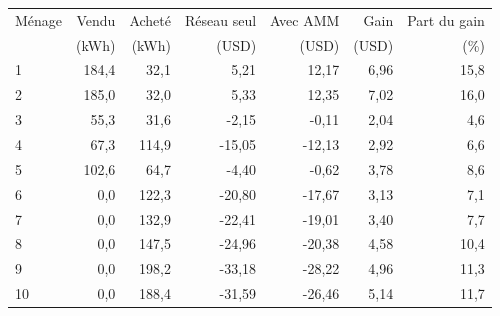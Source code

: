 \begin{tabular}{lrrrrrr}
\toprule
M\'enage & Vendu & Achet\'e & R\'eseau seul & Avec AMM & Gain & Part du gain \\
 & (kWh) & (kWh) & (USD) & (USD) & (USD) & (\%) \\
\midrule
1 & 184,4 & 32,1 & 5,21 & 12,17 & 6,96 & 15,8 \\
2 & 185,0 & 32,0 & 5,33 & 12,35 & 7,02 & 16,0 \\
3 & 55,3 & 31,6 & -2,15 & -0,11 & 2,04 & 4,6 \\
4 & 67,3 & 114,9 & -15,05 & -12,13 & 2,92 & 6,6 \\
5 & 102,6 & 64,7 & -4,40 & -0,62 & 3,78 & 8,6 \\
6 & 0,0 & 122,3 & -20,80 & -17,67 & 3,13 & 7,1 \\
7 & 0,0 & 132,9 & -22,41 & -19,01 & 3,40 & 7,7 \\
8 & 0,0 & 147,5 & -24,96 & -20,38 & 4,58 & 10,4 \\
9 & 0,0 & 198,2 & -33,18 & -28,22 & 4,96 & 11,3 \\
10 & 0,0 & 188,4 & -31,59 & -26,46 & 5,14 & 11,7 \\
\bottomrule
\end{tabular}